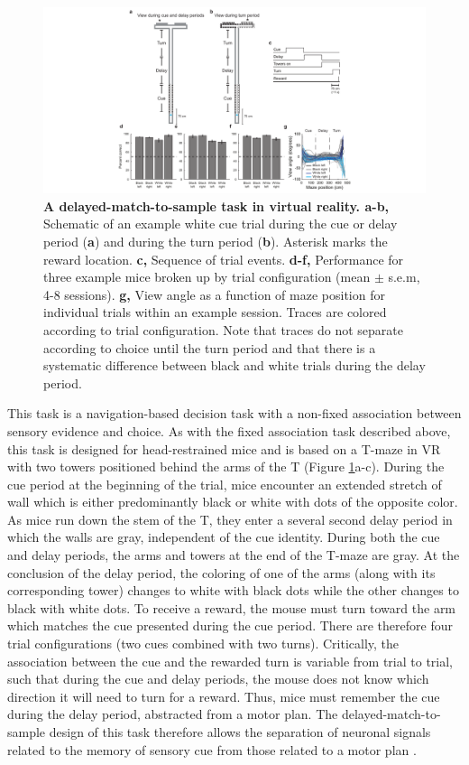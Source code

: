 \begin{figure}
\includegraphics[width=1.4\textwidth,center]{figures/fig_2_5.pdf}
\caption[A delayed-match-to-sample task in virtual reality.]{\textbf{A delayed-match-to-sample task in virtual reality. a-b,} Schematic of an example white cue trial during the cue or delay period (\textbf{a}) and during the turn period (\textbf{b}). Asterisk marks the reward location.
%
\textbf{c,} Sequence of trial events. 
%
\textbf{d-f,} Performance for three example mice broken up by trial configuration (mean $\pm$ s.e.m, 4-8 sessions).
%
\textbf{g,} View angle as a function of maze position for individual trials within an example session. Traces are colored according to trial configuration. Note that traces do not separate according to choice until the turn period and that there is a systematic difference between black and white trials during the delay period.
\label{fig:2_5}}
\end{figure}

This task is a navigation-based decision task with a non-fixed association between sensory evidence and choice. As with the fixed association task described above, this task is designed for head-restrained mice and is based on a T-maze in VR with two towers positioned behind the arms of the T (Figure \ref{fig:2_5}a-c). During the cue period at the beginning of the trial, mice encounter an extended stretch of wall which is either predominantly black or white with dots of the opposite color. As mice run down the stem of the T, they enter a several second delay period in which the walls are gray, independent of the cue identity. During both the cue and delay periods, the arms and towers at the end of the T-maze are gray. At the conclusion of the delay period, the coloring of one of the arms (along with its corresponding tower) changes to white with black dots while the other changes to black with white dots. To receive a reward, the mouse must turn toward the arm which matches the cue presented during the cue period. There are therefore four trial configurations (two cues combined with two turns). Critically, the association between the cue and the rewarded turn is variable from trial to trial, such that during the cue and delay periods, the mouse does not know which direction it will need to turn for a reward. Thus, mice must remember the cue during the delay period, abstracted from a motor plan. The delayed-match-to-sample design of this task therefore allows the separation of neuronal signals related to the memory of sensory cue from those related to a motor plan \citep{Freedman:2011hq}.

